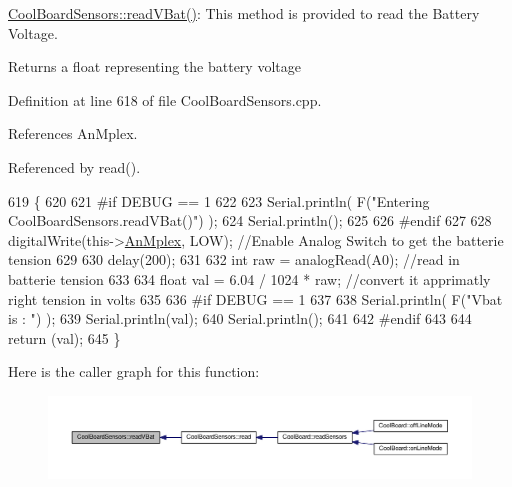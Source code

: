 \hyperlink{classCoolBoardSensors_a6944b6ea7bce8e2fce1b434acfd9d5f3}{Cool\+Board\+Sensors\+::read\+V\+Bat()}\+: This method is provided to read the Battery Voltage.

\begin{DoxyReturn}{Returns}
a float representing the battery voltage 
\end{DoxyReturn}


Definition at line 618 of file Cool\+Board\+Sensors.\+cpp.



References An\+Mplex.



Referenced by read().


\begin{DoxyCode}
619 \{
620 
621 \textcolor{preprocessor}{#if DEBUG == 1}
622 
623     Serial.println( F(\textcolor{stringliteral}{"Entering CoolBoardSensors.readVBat()"}) );
624     Serial.println();
625 
626 \textcolor{preprocessor}{#endif}
627 
628     digitalWrite(this->\hyperlink{classCoolBoardSensors_a12ef28b1046219e0aee10bf64e28c4a5}{AnMplex}, LOW);                            \textcolor{comment}{//Enable Analog Switch to get the
       batterie tension}
629     
630     delay(200);
631     
632     \textcolor{keywordtype}{int} raw = analogRead(A0);                                    \textcolor{comment}{//read in batterie tension}
633     
634     \textcolor{keywordtype}{float} val = 6.04 / 1024 * raw;                               \textcolor{comment}{//convert it apprimatly right tension in
       volts}
635     
636 \textcolor{preprocessor}{#if DEBUG == 1}
637 
638     Serial.println( F(\textcolor{stringliteral}{"Vbat is : "}) );
639     Serial.println(val);
640     Serial.println();
641 
642 \textcolor{preprocessor}{#endif}
643 
644     \textcolor{keywordflow}{return} (val);   
645 \}
\end{DoxyCode}
Here is the caller graph for this function\+:\nopagebreak
\begin{figure}[H]
\begin{center}
\leavevmode
\includegraphics[width=350pt]{classCoolBoardSensors_a6944b6ea7bce8e2fce1b434acfd9d5f3_icgraph}
\end{center}
\end{figure}
\mbox{\label{classCoolBoardSensors_a406307ffd70272282d91479c7ed8d66f}} 
